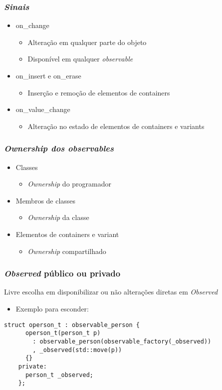 \documentclass[t]{beamer}
\begin{document}
\begin{frame}[fragile]
  \frametitle{\textit{Sinais}}
  \begin{itemize}
    \item<1->{on\_change}
      \begin{itemize}
        \item{Alteração em qualquer parte do objeto}
        \item{Disponível em qualquer \textit{observable}}
      \end{itemize}
    \item<2->{on\_insert e on\_erase}
      \begin{itemize}
        \item{Inserção e remoção de elementos de containers}
      \end{itemize}
    \item<3->{on\_value\_change}
      \begin{itemize}
        \item{Alteração no estado de elementos de containers e variants}
      \end{itemize}
  \end{itemize}
\end{frame}

\begin{frame}[fragile]
  \frametitle{\textit{\textit{Ownership} dos \textit{observables}}}
  \begin{itemize}
    \item<1->{Classes}
      \begin{itemize}
        \item{\textit{Ownership} do programador}
      \end{itemize}
    \item<2->{Membros de classes}
      \begin{itemize}
        \item{\textit{Ownership} da classe}
      \end{itemize}
    \item<3->{Elementos de containers e variant}
      \begin{itemize}
        \item{\textit{Ownership} compartilhado}
      \end{itemize}
  \end{itemize}
\end{frame}

\begin{frame}[fragile]
  \frametitle{\textit{Observed} público ou privado}
  Livre escolha em disponibilizar ou não alterações diretas em \textit{Observed}
  \begin{itemize}
    \item{Exemplo para esconder:}
  \end{itemize}
  \begin{lstlisting}[basicstyle=\small]
    struct operson_t : observable_person {
      operson_t(person_t p) 
        : observable_person(observable_factory(_observed)) 
        , _observed(std::move(p))
      {}
    private:
      person_t _observed;
    };
  \end{lstlisting}
\end{frame}
\end{document}
